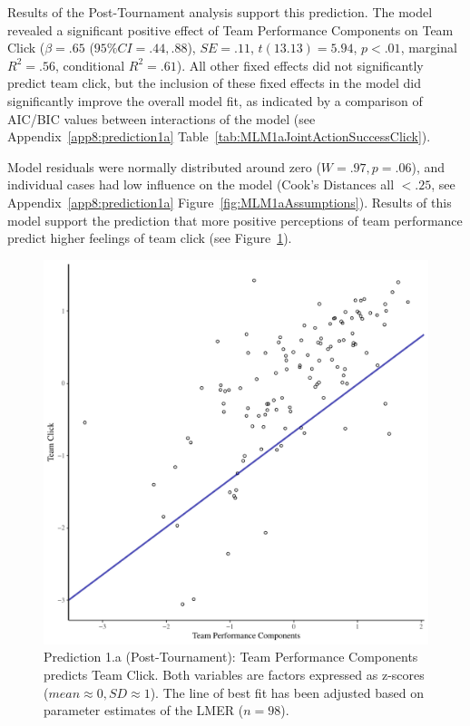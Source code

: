 \begin{CJK}{UTF8}{gbsn}
Results of the Post-Tournament analysis support this prediction. The model revealed a significant positive effect of Team Performance Components on Team Click ($\beta = .65$ ($95\% CI = .44, .88$), $SE = .11$, $t(13.13) = 5.94$, $p < .01$, marginal $R^2 = .56$, conditional $R^2 = .61$).  All other fixed effects did not significantly predict team click, but the inclusion of these fixed effects in the model did significantly improve the overall model fit, as indicated by a comparison of AIC/BIC values between interactions of the model (see Appendix~\ref{app8:prediction1a} Table~\ref{tab:MLM1aJointActionSuccessClick}).

Model residuals were normally distributed around zero ($W = .97, p = .06$), and individual cases had low influence on the model (Cook's Distances all $< .25$, see Appendix~\ref{app8:prediction1a} Figure~\ref{fig:MLM1aAssumptions}). Results of this model support the prediction that more positive perceptions of team performance predict higher feelings of team click (see Figure~\ref{fig:jasClickModelSLope}).

\begin{figure}[htbp]
  \centering
\includegraphics[scale = .5]{images/jasClickModelSlope}
  \caption{Prediction 1.a (Post-Tournament): Team Performance Components predicts Team Click.  Both variables are factors expressed as z-scores ($mean \approx 0, SD \approx 1$).  The line of best fit has been adjusted based on parameter estimates of the LMER ($n = 98$).}
  \label{fig:jasClickModelSLope}
\end{figure}




\end{CJK}

